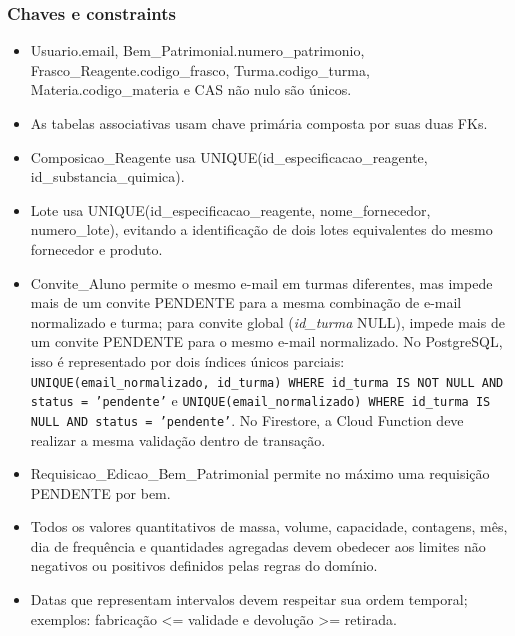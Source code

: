 \documentclass[12pt,a4paper]{article}
\begin{document}
\subsubsection{Chaves e constraints}
\begin{itemize}
    \item Usuario.email, Bem\_Patrimonial.numero\_patrimonio, Frasco\_Reagente.codigo\_frasco, Turma.codigo\_turma, Materia.codigo\_materia e CAS não nulo são únicos.
    \item As tabelas associativas usam chave primária composta por suas duas FKs.
    \item Composicao\_Reagente usa UNIQUE(id\_especificacao\_reagente, id\_substancia\_quimica).
    \item Lote usa UNIQUE(id\_especificacao\_reagente, nome\_fornecedor, numero\_lote), evitando a identificação de dois lotes equivalentes do mesmo fornecedor e produto.
    \item Convite\_Aluno permite o mesmo e-mail em turmas diferentes, mas impede mais de um convite PENDENTE para a mesma combinação de e-mail normalizado e turma; para convite global (\textit{id\_turma} NULL), impede mais de um convite PENDENTE para o mesmo e-mail normalizado. No PostgreSQL, isso é representado por dois índices únicos parciais: \texttt{UNIQUE(email\_normalizado, id\_turma) WHERE id\_turma IS NOT NULL AND status = 'pendente'} e \texttt{UNIQUE(email\_normalizado) WHERE id\_turma IS NULL AND status = 'pendente'}. No Firestore, a Cloud Function deve realizar a mesma validação dentro de transação.
    \item Requisicao\_Edicao\_Bem\_Patrimonial permite no máximo uma requisição PENDENTE por bem.
    \item Todos os valores quantitativos de massa, volume, capacidade, contagens, mês, dia de frequência e quantidades agregadas devem obedecer aos limites não negativos ou positivos definidos pelas regras do domínio.
    \item Datas que representam intervalos devem respeitar sua ordem temporal; exemplos: fabricação <= validade e devolução >= retirada.
\end{itemize}
\end{document}
